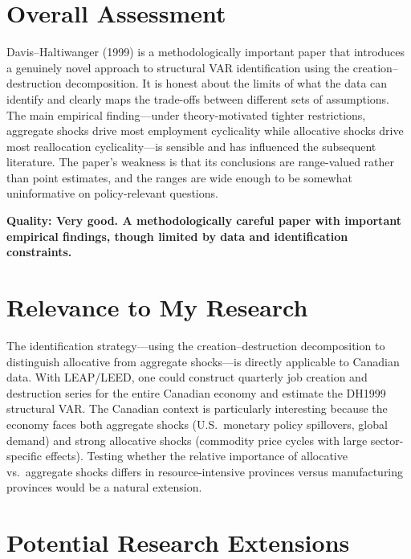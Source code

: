\section{Overall Assessment}

Davis--Haltiwanger (1999) is a methodologically important paper that introduces
a genuinely novel approach to structural VAR identification using the
creation--destruction decomposition. It is honest about the limits of what the
data can identify and clearly maps the trade-offs between different sets of
assumptions. The main empirical finding---under theory-motivated tighter
restrictions, aggregate shocks drive most employment cyclicality while
allocative shocks drive most reallocation cyclicality---is sensible and has
influenced the subsequent literature. The paper's weakness is that its
conclusions are range-valued rather than point estimates, and the ranges are
wide enough to be somewhat uninformative on policy-relevant questions.

\textbf{Quality: Very good. A methodologically careful paper with important
empirical findings, though limited by data and identification constraints.}

\section{Relevance to My Research}

The identification strategy---using the creation--destruction decomposition to
distinguish allocative from aggregate shocks---is directly applicable to
Canadian data. With LEAP/LEED, one could construct quarterly job creation and
destruction series for the entire Canadian economy and estimate the DH1999
structural VAR. The Canadian context is particularly interesting because the
economy faces both aggregate shocks (U.S.\ monetary policy spillovers, global
demand) and strong allocative shocks (commodity price cycles with large
sector-specific effects). Testing whether the relative importance of allocative
vs.\ aggregate shocks differs in resource-intensive provinces versus
manufacturing provinces would be a natural extension.

\section{Potential Research Extensions}

